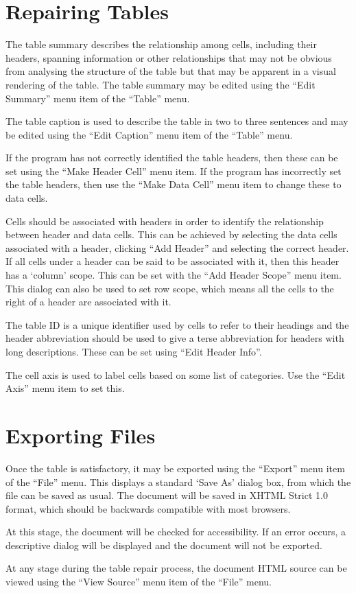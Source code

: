 \section*{Repairing Tables}

The table summary describes the relationship among cells, including their
headers, spanning information or other relationships that may not be obvious
from analysing the structure of the table but that may be apparent in a visual
rendering of the table. The table summary may be edited using the ``Edit Summary''
menu item of the ``Table'' menu.

The table caption is used to describe the table in two to three sentences and may
be edited using the ``Edit Caption'' menu item of the ``Table'' menu.

If the program has not correctly identified the table headers, then these can be
set using the ``Make Header Cell'' menu item. If the program has incorrectly
set the table headers, then use the ``Make Data Cell'' menu item to change
these to data cells.

Cells should be associated with headers in order to identify the relationship
between header and data cells. This can be achieved by selecting the data cells
associated with a header, clicking ``Add Header'' and selecting the correct
header. If all cells under a header can be said to be associated with it, then
this header has a `column' scope. This can be set with the ``Add Header Scope''
menu item. This dialog can also be used to set row scope, which means all the
cells to the right of a header are associated with it.

The table ID is a unique identifier used by cells to refer to their headings
and the header abbreviation should be used to give a terse abbreviation for
headers with long descriptions. These can be set using ``Edit Header Info''.

The cell axis is used to label cells based on some list of categories. Use the
``Edit Axis'' menu item to set this.

\section*{Exporting Files}

Once the table is satisfactory, it may be exported using the ``Export'' menu item
of the ``File'' menu. This displays a standard `Save As' dialog box, from which
the file can be saved as usual. The document will be saved in XHTML Strict 1.0
format, which should be backwards compatible with most browsers.

At this stage, the document will be checked for accessibility. If an error occurs,
a descriptive dialog will be displayed and the document will not be exported.

At any stage during the table repair process, the document HTML source can be viewed
using the ``View Source'' menu item of the ``File'' menu.


